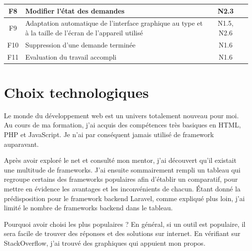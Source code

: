 \documentclass[
    iai, %
    eai, %
]{heig-tb}
\begin{document}
\begin{table}[h]
\begin{center}
\begin{tabularx}{\textwidth}{cXcc}
      F8  & Modifier l'état des demandes                                                                                                                                                               & N2.3       \\ \midrule
      F9  & Adaptation automatique de l'interface graphique au type et à la taille de l'écran de l'appareil utilisé                                                                                    & N1.5, N2.6 \\ \midrule
      F10 & Suppression d'une demande terminée                                                                                                                                                         & N1.6       \\ \midrule
      F11 & Evaluation du travail accompli                                                                                                                                                             & N1.6       \\ \midrule
    \end{tabularx}
  \end{center}
\end{table}

\newpage
\section{Choix technologiques}
Le monde du développement web est un univers totalement nouveau pour moi.
Au cours de ma formation, j'ai acquis des compétences très basiques en HTML, PHP et JavaScript.
Je n'ai par conséquent jamais utilisé de framework auparavant.

Après avoir exploré le net et consulté mon mentor, j'ai découvert qu'il existait une multitude de frameworks.
J'ai ensuite sommairement rempli un tableau qui regroupe certains des frameworks populaires afin d'établir un comparatif, pour mettre en évidence les avantages et les inconvénients de chacun.
Étant donné la prédisposition pour le framework backend Laravel, comme expliqué plus loin, j'ai limité le nombre de frameworks backend dans le tableau.

Pourquoi avoir choisi les plus populaires ? En général, si un outil est populaire, il sera facile de trouver des réponses et des solutions sur internet.
En vérifiant sur StackOverflow, j'ai trouvé des graphiques qui appuient mon propos.
\end{document}
